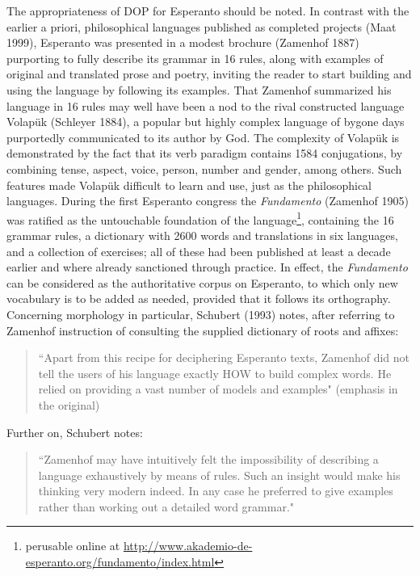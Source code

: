 \documentclass[10pt,a4paper]{article}
\begin{document}
The appropriateness of DOP for Esperanto should be noted. In contrast with the
earlier a priori, philosophical languages published as completed projects
(Maat 1999), Esperanto was presented in a modest brochure (Zamenhof 1887)
purporting to fully describe its grammar in 16 rules, along with examples of
original and translated prose and poetry, inviting the reader to start
building and using the language by following its examples. That Zamenhof
summarized his language in 16 rules may well have been a nod to the rival
constructed language Volap\"uk (Schleyer 1884), a popular but highly complex
language of bygone days purportedly communicated to its author by God.  The
complexity of Volap\"uk is demonstrated by the fact that its verb paradigm
contains 1584 conjugations, by combining tense, aspect, voice, person, number
and gender, among others. Such features made Volap\"uk difficult to learn and
use, just as the philosophical languages. During the first Esperanto congress
the {\em Fundamento} (Zamenhof 1905) was ratified as the untouchable foundation
of the language\footnote{perusable online at
\url{http://www.akademio-de-esperanto.org/fundamento/index.html}}, containing
the 16 grammar rules, a dictionary with 2600 words and translations in six
languages, and a collection of
exercises; all of these had been published at least a decade earlier and where
already sanctioned through practice. In effect, the {\em Fundamento} can be
considered as the authoritative corpus on Esperanto, to which only new
vocabulary is to be added as needed, provided that it follows its orthography.
Concerning morphology in particular, Schubert (1993) notes, after referring to
Zamenhof instruction of consulting the supplied dictionary of roots and
affixes:

\begin{quote}
	``Apart from this recipe for deciphering Esperanto texts,
	Zamenhof did not tell the users of his language exactly HOW to
	build complex words. He relied on providing a vast number of models and
	examples" (emphasis in the original)
\end{quote}

Further on, Schubert notes:

\begin{quote}
	``Zamenhof may have intuitively felt the impossibility of describing a
	language exhaustively by means of rules. Such an insight would make his
	thinking very modern indeed. In any case he preferred to give examples
	rather than working out a detailed word grammar."
\end{quote}
\end{document}
